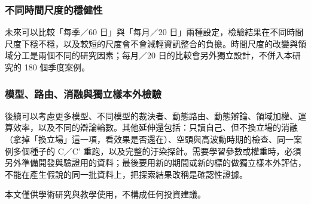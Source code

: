\documentclass[12pt,a4paper]{article}
\numberwithin{table}{section}
\numberwithin{figure}{section}
\begin{document}
\subsubsection{不同時間尺度的穩健性}

未來可以比較「每季／60 日」與「每月／20 日」兩種設定，檢驗結果在不同時間尺度下穩不穩，以及較短的尺度會不會減輕資訊整合的負擔。時間尺度的改變與領域分工是兩個不同的研究因素；每月／20 日的比較會另外獨立設計，不併入本研究的 180 個季度案例。

\subsubsection{模型、路由、消融與獨立樣本外檢驗}

後續可以考慮更多模型、不同模型的裁決者、動態路由、動態辯論、領域加權、運算效率，以及不同的辯論輪數。其他延伸還包括：只讀自己、但不換立場的消融（拿掉「換立場」這一項，看效果是否還在）、空頭與高波動時期的檢查、同一案例多個種子的 C／C' 重跑，以及完整的汙染探針。需要學習參數或權重時，必須另外準備開發與驗證用的資料；最後要用新的期間或新的標的做獨立樣本外評估，不能在產生假說的同一批資料上，把探索結果改稱是確認性證據。

\clearpage
{}



\vspace{0.3cm}
\noindent\small 本文僅供學術研究與教學使用，不構成任何投資建議。
\end{document}
